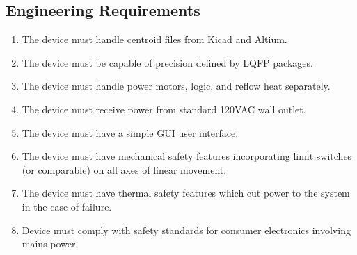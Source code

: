 \subsection{Engineering Requirements}
\begin{enumerate}
    \item The device must handle centroid files from Kicad and Altium.
    \item The device must be capable of precision defined by LQFP packages.
    \item The device must handle power motors, logic, and reflow heat separately.
    \item The device must receive power from standard 120VAC wall outlet.
    \item The device must have a simple GUI user interface.
    \item The device must have mechanical safety features incorporating limit switches (or comparable) on all axes of linear movement.
    \item The device must have thermal safety features which cut power to the system in the case of failure.
    \item Device must comply with safety standards for consumer electronics involving mains power.
\end{enumerate}


